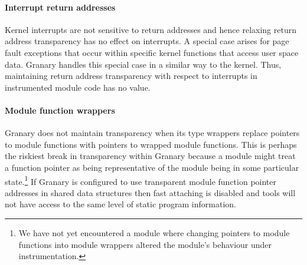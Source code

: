 \documentclass[preprint]{sigplanconf}
\begin{document}
\vspace{-3pt}\paragraph{Interrupt return addresses} Kernel interrupts are not sensitive to return addresses and hence relaxing return address transparency has no effect on interrupts. A special case arises for page fault exceptions that occur within specific kernel functions that access user space data. Granary handles this special case in a similar way to the kernel. Thus, maintaining return address transparency with respect to interrupts in instrumented module code has no value.

\vspace{-3pt}\paragraph{Module function wrappers} Granary does not maintain transparency when its type wrappers replace pointers to module functions with pointers to wrapped module functions. This is perhaps the riskiest break in transparency within Granary because a module might treat a function pointer as being representative of the module being in some particular state.\footnote{We have not yet encountered a module where changing pointers to module functions into module wrappers altered the module's behaviour under instrumentation.} If Granary is configured to use transparent module function pointer addresses in shared data structures then fast attaching is disabled and tools will not have access to the same level of static program information.
\end{document}
